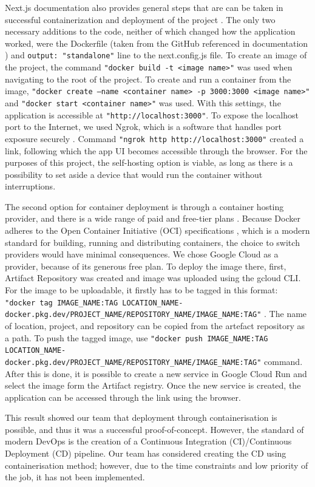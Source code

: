 Next.js documentation also provides general steps that are can be taken in successful containerization and deployment of the project \cite{vercelMainDeploymentMainPage, nextjs_docker_example}. The only two necessary additions to the code, neither of which changed how the application worked, were the Dockerfile (taken from the GitHub referenced in documentation \cite{nextjs_dockerfile}) and \texttt{output: "standalone"} line to the next.config.js file. To create an image of the project, the command \texttt{"docker build -t <image name>"} was used when navigating to the root of the project. To create and run a container from the image, \texttt{"docker create --name <container name> -p 3000:3000 <image name>"} and \texttt{"docker start <container name>"} was used. With this settings, the application is accessible at \texttt{"http://localhost:3000"}. To expose the localhost port to the Internet, we used Ngrok, which is a software that handles port exposure securely \cite{ngrokMain} \cite{ngrokMainDocs}. Command \texttt{"ngrok http http://localhost:3000"} created a link, following which the app UI becomes accessible through the browser. For the purposes of this project, the self-hosting option is viable, as long as there is a possibility to set aside a device that would run the container without interruptions.

The second option for container deployment is through a container hosting provider, and there is a wide range of paid and free-tier plans \cite{dockerDeploymentServices}. Because Docker adheres to the Open Container Initiative (OCI) specifications \cite{OCIdocker}, which is a modern standard for building, running and distributing containers, the choice to switch providers would have minimal consequences. We chose Google Cloud as a provider, because of its generous free plan. To deploy the image there, first, Artifact Repository was created and image was uploaded using the gcloud CLI. For the image to be uploadable, it firstly has to be tagged in this format: \texttt{"\lstinline|docker tag IMAGE_NAME:TAG LOCATION_NAME-docker.pkg.dev/PROJECT_NAME/REPOSITORY_NAME/IMAGE_NAME:TAG|"} \cite{GoogleCloudRunDocs}. The name of location, project, and repository can be copied from the artefact repository as a path. To push the tagged image, use \lstinline|"docker push IMAGE_NAME:TAG LOCATION_NAME-docker.pkg.dev/PROJECT_NAME/REPOSITORY_NAME/IMAGE_NAME:TAG"| command. After this is done, it is possible to create a new service in Google Cloud Run and select the image form the Artifact registry. Once the new service is created, the application can be accessed through the link using the browser. 

This result showed our team that deployment through containerisation is possible, and thus it was a successful proof-of-concept. However, the standard of modern DevOps is the creation of a Continuous Integration (CI)/Continuous Deployment (CD) pipeline. Our team has considered creating the CD using containerisation method; however, due to the time constraints and low priority of the job, it has not been implemented.